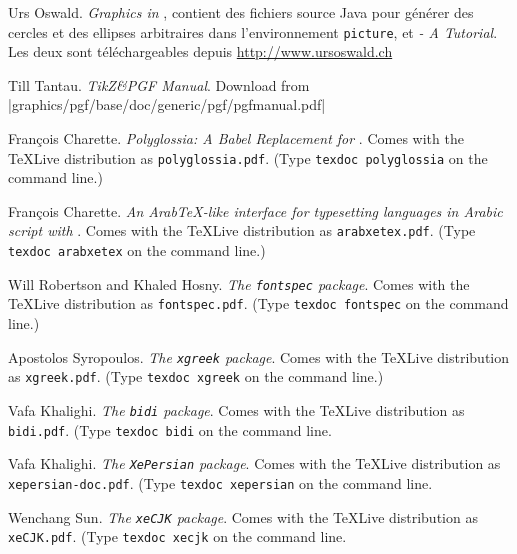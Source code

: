 \begin{thebibliography}{99}
 Urs Oswald.
    \newblock \emph{Graphics in \LaTeXe{}}, contient des fichiers
    source Java pour générer des cercles et des ellipses arbitraires
    dans l'environnement \texttt{picture}, et \emph{\MP{} - A
      Tutorial}.
  \newblock Les deux sont téléchargeables depuis \url{http://www.ursoswald.ch}

 Till Tantau.
  \newblock \emph{TikZ\&PGF Manual}.\newblock
  Download from \CTAN|graphics/pgf/base/doc/generic/pgf/pgfmanual.pdf|

 Fran\c{c}ois Charette.
    \newblock \emph{Polyglossia: A Babel Replacement for }.
    \newblock Comes with the \TeX Live distribution as
  \texttt{polyglossia.pdf}. (Type \texttt{texdoc polyglossia} on the command line.)

 Fran\c{c}ois Charette.
    \newblock \emph{An Arab\TeX-like interface for typesetting languages
     in Arabic script with }.
    \newblock Comes with the \TeX Live distribution as
  \texttt{arabxetex.pdf}. (Type \texttt{texdoc arabxetex} on the command line.)

 Will Robertson and Khaled Hosny.
    \newblock \emph{The \texttt{fontspec} package}.
    \newblock Comes with the \TeX Live distribution as
  \texttt{fontspec.pdf}. (Type \texttt{texdoc fontspec} on the command line.)

 Apostolos Syropoulos.
    \newblock \emph{The \texttt{xgreek} package}.
    \newblock Comes with the \TeX Live distribution as
  \texttt{xgreek.pdf}. (Type \texttt{texdoc xgreek} on the command line.)

 Vafa Khalighi.
    \newblock \emph{The \texttt{bidi} package}.
    \newblock Comes with the \TeX Live distribution as
  \texttt{bidi.pdf}. (Type \texttt{texdoc bidi} on the command line.

 Vafa Khalighi.
    \newblock \emph{The \texttt{XePersian} package}.
    \newblock Comes with the \TeX Live distribution as
  \texttt{xepersian-doc.pdf}. (Type \texttt{texdoc xepersian} on the command line.

 Wenchang Sun.
    \newblock \emph{The \texttt{xeCJK} package}.
    \newblock Comes with the \TeX Live distribution as
  \texttt{xeCJK.pdf}. (Type \texttt{texdoc xecjk} on the command line.

\end{thebibliography}


%

